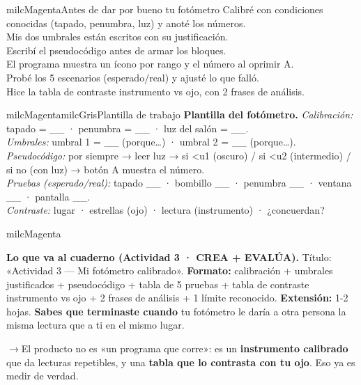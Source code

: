 \documentclass[11pt,letterpaper]{article}
\newcommand{\puente}[1]{%
  \begin{puentebox}%
    \textcolor{milcGradeDark}{$\rightarrow$}\hspace{2mm}#1%
  \end{puentebox}%
}
\newcommand{\checkbox}{\textcolor{milcGradeDark}{\fbox{\phantom{x}}}\hspace{5pt}}
\begin{document}
\begin{drawbox}{milcMagenta}{Antes de dar por bueno tu fotómetro}
\checkbox Calibré con condiciones conocidas (tapado, penumbra, luz) y anoté los números. \\[1mm]
\checkbox Mis dos umbrales están escritos con su justificación. \\[1mm]
\checkbox Escribí el pseudocódigo antes de armar los bloques. \\[1mm]
\checkbox El programa muestra un ícono por rango y el número al oprimir A. \\[1mm]
\checkbox Probé los 5 escenarios (esperado/real) y ajusté lo que falló. \\[1mm]
\checkbox Hice la tabla de contraste instrumento vs ojo, con 2 frases de análisis.
\end{drawbox}

\begin{softbox}{milcMagenta}{milcGris}{Plantilla de trabajo}
\textbf{Plantilla del fotómetro.} \textit{Calibración:} tapado = \_\_ · penumbra = \_\_ · luz del salón = \_\_. \\[1mm]
\textit{Umbrales:} umbral 1 = \_\_ (porque\ldots) · umbral 2 = \_\_ (porque\ldots). \\[1mm]
\textit{Pseudocódigo:} por siempre → leer luz → si <u1 (oscuro) / si <u2 (intermedio) / si no (con luz) → botón A muestra el número. \\[1mm]
\textit{Pruebas (esperado/real):} tapado \_\_ · bombillo \_\_ · penumbra \_\_ · ventana \_\_ · pantalla \_\_. \\[1mm]
\textit{Contraste:} lugar · estrellas (ojo) · lectura (instrumento) · ¿concuerdan?
\end{softbox}

\begin{infoband}{milcMagenta}


\textbf{Lo que va al cuaderno (Actividad 3 · CREA + EVALÚA).} Título: «Actividad 3 --- Mi fotómetro calibrado». \textbf{Formato:} calibración + umbrales justificados + pseudocódigo + tabla de 5 pruebas + tabla de contraste instrumento vs ojo + 2 frases de análisis + 1 límite reconocido. \textbf{Extensión:} 1-2 hojas. \textbf{Sabes que terminaste cuando} tu fotómetro le daría a otra persona la misma lectura que a ti en el mismo lugar.
\end{infoband}

\puente{El producto no es «un programa que corre»: es un \textbf{instrumento calibrado} que da lecturas repetibles, y una \textbf{tabla que lo contrasta con tu ojo}. Eso ya es medir de verdad.}
\end{document}
